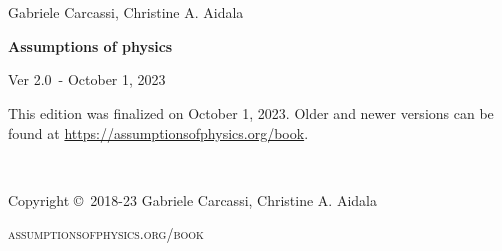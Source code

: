 \documentclass[11pt,letterpaper,fleqn]{memoir} %
\newif\ifdraft
\newcommand{\bookversion}{2.0}
\newcommand{\bookdate}{October 1, 2023}
\begin{document}
	





\frontmatter
\thispagestyle{empty} %

\newpage
\thispagestyle{empty}
~
\newpage

~
\thispagestyle{empty}

\vspace{20pt}

{\large \noindent Gabriele Carcassi, Christine A. Aidala }

\vspace{60pt}

{\Huge \noindent \textbf{Assumptions of physics}}

\vspace{30pt}

\ifdraft {\large \noindent Working DRAFT for Ver \bookversion  ~- \today}
\else {\large \noindent Ver \bookversion  ~- \bookdate}
\fi

\vfill


\ifdraft 
\noindent \textbf{This book is a work in progress}. This draft is a development copy built on \today. It is provided as-is for the purpose of early review and feedback. You can get the latest draft from \url{https://assumptionsofphysics.org/book}. 
\else
\noindent This edition was finalized on \bookdate. Older and newer versions can be found at  \url{https://assumptionsofphysics.org/book}.
\fi

\newpage
~\vfill
\thispagestyle{empty}

\noindent Copyright \copyright\ 2018-23 Gabriele Carcassi, Christine A. Aidala

\vspace{12pt}

\noindent \textsc{assumptionsofphysics.org/book}
\end{document}
